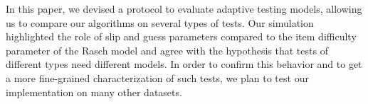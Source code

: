 \documentclass{edm_template}
\begin{document}







In this paper, we devised a protocol to evaluate adaptive testing models, allowing us to compare our algorithms on several types of tests. Our simulation highlighted the role of slip and guess parameters compared to the item difficulty parameter of the Rasch model and agree with the hypothesis that tests of different types need different models. In order to confirm this behavior and to get a more fine-grained characterization of such tests, we plan to test our implementation on many other datasets. %
\end{document}
